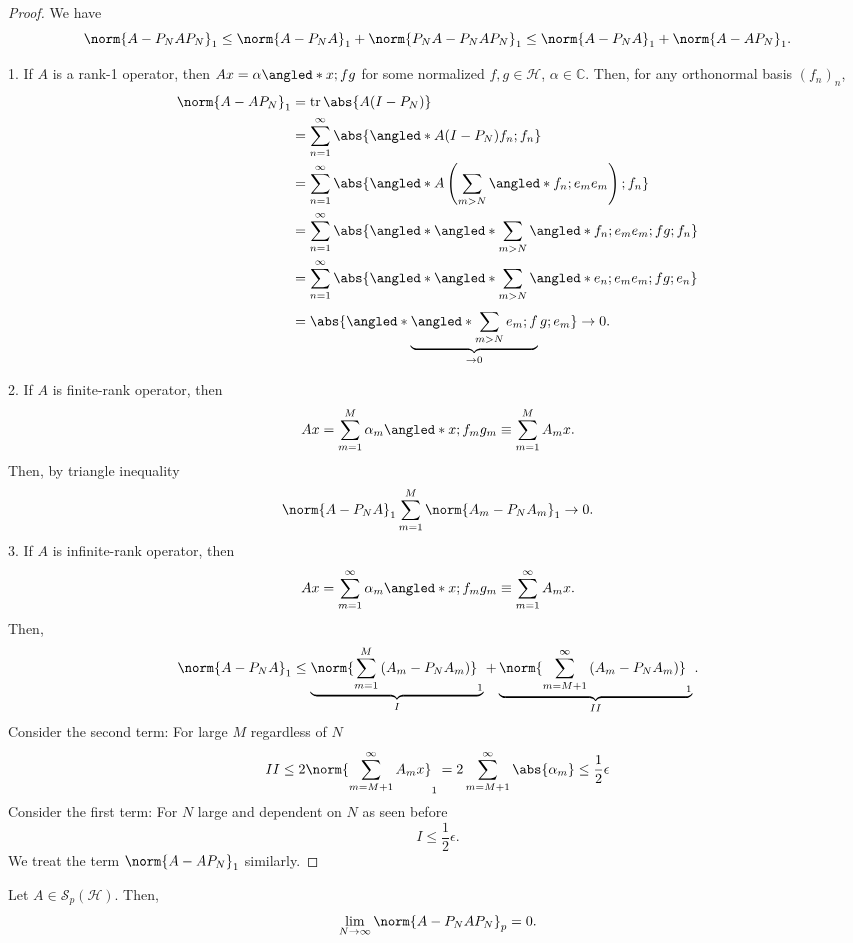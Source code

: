 \begin{proof}
    We have 
    \[ \norm{A-P_NAP_N}_{1} \leq \norm{A-P_NA}_{1} + \norm{P_NA-P_NAP_N}_{1} \leq \norm{A-P_NA}_{1}+ \norm{A-AP_N}_{1} .\]

    1. If \( A \) is a rank-1 operator, then \( Ax= \alpha \angled*{x;f}g \) for some normalized \( f,g \in \mathcal{H} \), \( \alpha \in \mathbb{C} \). Then, for any orthonormal basis \( (f_n)_n \),
    \begin{align*}
      \norm{A-AP_N}_{1} &= \operatorname{tr} \abs{ A(I-P_N)} \\
                        &= \sum_{n=1}^{\infty} \abs{\angled*{A(I-P_N)f_n;f_n}} \\
                        &= \sum_{n=1}^{\infty} \abs{\angled*{A\left(\sum_{m >N}^{} \angled*{f_n;e_m}e_m\right);f_n}} \\ 
                        &= \sum_{n=1}^{\infty} \abs{ \angled*{ \angled*{\sum_{m>N}^{} \angled*{f_n;e_m}e_m;f}g;f_n}} \\
                        &= \sum_{n=1}^{\infty} \abs{ \angled*{ \angled*{\sum_{m>N}^{} \angled*{e_n;e_m}e_m;f}g;e_n}} \\
                        &= \abs{ \angled*{ \underbrace{\angled*{\sum_{m >N}^{} e_m;f}}_{\to 0}g;e_m}} \to 0.
    \end{align*}  

   2. If \( A \) is finite-rank operator, then 
   \[ Ax= \sum_{m=1}^{M} \alpha_m \angled*{x; f_m} g_m \equiv \sum_{m=1}^{M} A_m x .\] 
   Then, by triangle inequality 
   \[ \norm{A-P_NA}_{1} \sum_{m=1}^{M} \norm{A_m-P_NA_m}_{1} \to 0 .\]
   3. If \( A \) is infinite-rank operator, then
   \[ Ax = \sum_{m=1}^{\infty} \alpha_m \angled*{x;f_m}g_m \equiv \sum_{m=1}^{\infty} A_mx. \]
   Then, 
   \[ \norm{A-P_NA}_{1} \leq \underbrace{ \norm{\sum_{m=1}^{M} \left(A_m-P_NA_m\right)}_{1}}_{I}+ \underbrace{\norm{\sum_{m=M+1}^{\infty} \left(A_m-P_NA_m\right)}_{1}}_{II} .\]
  Consider the second term: For large \( M \) regardless of \( N \)
  \[ II \leq 2 \norm{\sum_{m=M+1}^{\infty}A_mx}_{1} = 2 \sum_{m=M+1}^{\infty} \abs{\alpha_m} \leq \frac{1}{2} \epsilon \]
  Consider the first term: For \( N \) large and dependent on \( N \) as seen before
  \[ I \leq \frac{1}{2}\epsilon. \]
  We treat the term \( \norm{A-AP_N}_{1} \) similarly.
\end{proof}

\begin{corl}[]
    Let \( A \in \mathcal{S}_p(\mathcal{H}) \). Then,
    \[ \lim_{N \to \infty} \norm{A-P_NAP_N}_{p}=0. \]
\end{corl}

